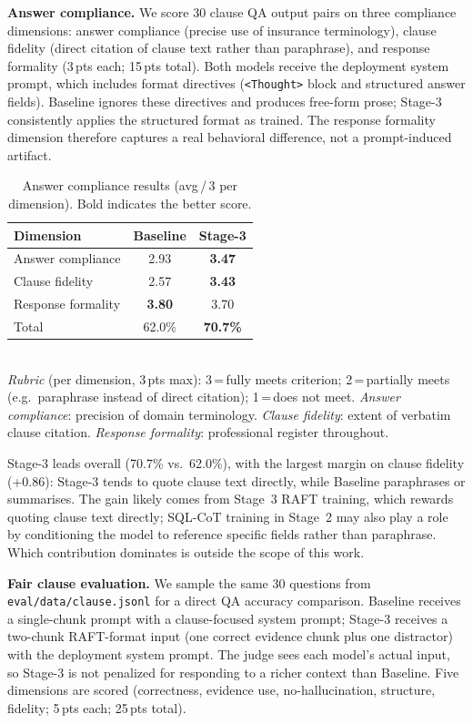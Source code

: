 \noindent\textbf{Answer compliance.}
We score 30 clause QA output pairs on three compliance dimensions: answer
compliance (precise use of insurance terminology), clause fidelity (direct
citation of clause text rather than paraphrase), and response formality
(3\,pts each; 15\,pts total).
Both models receive the deployment system prompt, which includes format
directives (\texttt{<Thought>} block and structured answer fields).
Baseline ignores these directives and produces free-form prose; Stage-3
consistently applies the structured format as trained.
The response formality dimension therefore captures a real behavioral
difference, not a prompt-induced artifact.

\begin{table}[htbp]
\centering
\caption{Answer compliance results (avg\,/\,3 per dimension).
Bold indicates the better score.}
\label{tab:compliance}
\small
\begin{tabular}{@{}lcc@{}}
\toprule
Dimension & Baseline & Stage-3 \\
\midrule
Answer compliance   & 2.93 & \textbf{3.47} \\
Clause fidelity     & 2.57 & \textbf{3.43} \\
Response formality  & \textbf{3.80} & 3.70 \\
\midrule
Total               & 62.0\% & \textbf{70.7\%} \\
\bottomrule
\end{tabular}\\[4pt]
{\footnotesize \textit{Rubric} (per dimension, 3\,pts max): 3\,=\,fully meets
criterion; 2\,=\,partially meets (e.g.\ paraphrase instead of direct citation);
1\,=\,does not meet. \emph{Answer compliance}: precision of domain terminology.
\emph{Clause fidelity}: extent of verbatim clause citation.
\emph{Response formality}: professional register throughout.}
\end{table}

Stage-3 leads overall (70.7\% vs.\ 62.0\%), with the largest margin on clause
fidelity (+0.86): Stage-3 tends to quote clause text directly, while Baseline
paraphrases or summarises.
The gain likely comes from Stage~3 RAFT training, which rewards quoting clause
text directly; SQL-CoT training in Stage~2 may also play a role by conditioning
the model to reference specific fields rather than paraphrase.
Which contribution dominates is outside the scope of this work.

\noindent\textbf{Fair clause evaluation.}
We sample the same 30 questions from \texttt{eval/data/clause.jsonl} for a
direct QA accuracy comparison.
Baseline receives a single-chunk prompt with a clause-focused system prompt;
Stage-3 receives a two-chunk RAFT-format input (one correct evidence chunk
plus one distractor) with the deployment system prompt.
The judge sees each model's actual input, so Stage-3 is not penalized for
responding to a richer context than Baseline.
Five dimensions are scored (correctness, evidence use, no-hallucination,
structure, fidelity; 5\,pts each; 25\,pts total).

